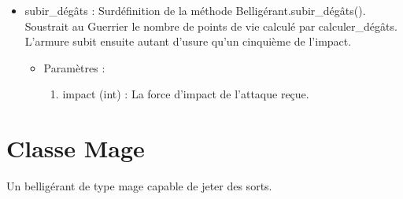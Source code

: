\documentclass[12pt,pdftex,oneside]{article}
\begin{document}
\begin{itemize}
\begin{enumerate}
\begin{itemize}
    \item subir\_dégâts : Surdéfinition de la méthode
      Belligérant.subir\_dégâts(). Soustrait au Guerrier le nombre de points de
      vie calculé par calculer\_dégâts. L'armure subit ensuite autant
      d'usure qu'un cinquième de l'impact.
      \begin{itemize}
      \item Paramètres : 
        \begin{enumerate}
        \item impact (int) : La force d'impact de l'attaque reçue.
        \end{enumerate}
      \end{itemize}

      \end{itemize}

    \end{enumerate}
  \end{itemize}


  \section {Classe Mage}

  Un belligérant de type mage capable de jeter des sorts.
\end{document}
